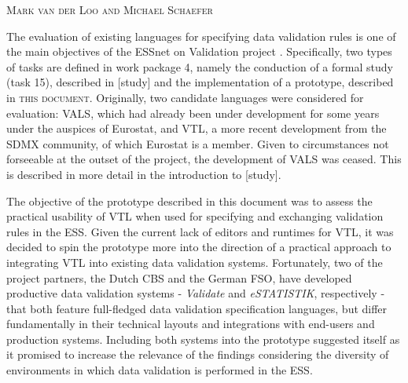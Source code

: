 \textsc{Mark van der Loo and Michael Schaefer}
\vspace{0.6 cm}

The evaluation of existing languages for specifying data validation rules is
one of the main objectives of the ESSnet on Validation project \citep{ESS:2015}. Specifically, two types of tasks are defined in work package 4,
namely the conduction of a formal study (task 15), described in [study] and the
implementation of a prototype, described in \textsc{this document}. Originally,
two candidate languages were considered for evaluation: VALS, which had already
been under development for some years under the auspices of Eurostat, and VTL,
a more recent development from the SDMX community, of which Eurostat is a
member. Given to circumstances not forseeable at the outset of the project, the
development of VALS was ceased. This is described in more detail in the
introduction to [study].

The objective of the prototype described in this document was to assess the
practical usability of VTL when used for specifying and exchanging validation
rules in the ESS. Given the current lack of editors and runtimes for VTL, it
was decided to spin the prototype more into the direction of a practical
approach to integrating VTL into existing data validation systems. Fortunately,
two of the project partners, the Dutch CBS and the German FSO, have developed
productive data validation systems -  \textit{Validate} and
\textit{eSTATISTIK}, respectively - that both feature full-fledged data
validation specification languages, but differ fundamentally in their technical
layouts and integrations with end-users and production systems. Including both
systems into the prototype suggested itself as it promised to increase the
relevance of the findings considering the diversity of environments in which
data validation is performed in the ESS.
